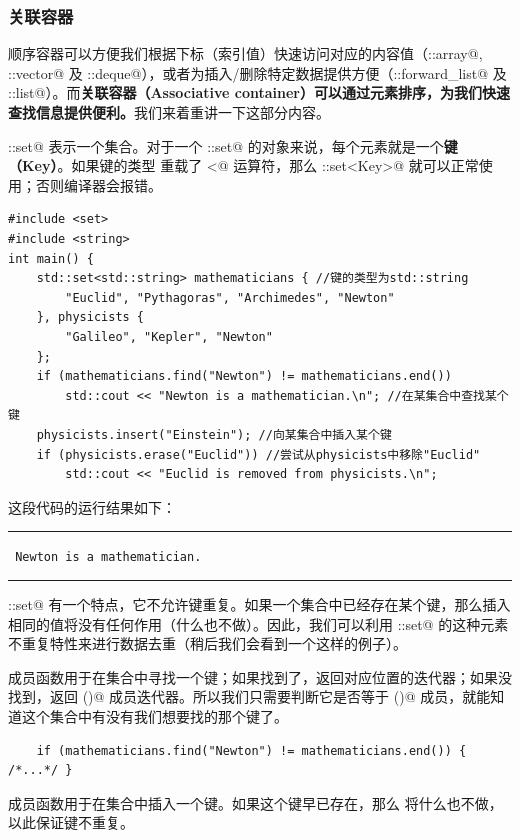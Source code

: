 \subsubsection*{关联容器}
顺序容器可以方便我们根据下标（索引值）快速访问对应的内容值（\lstinline@std::array@, \lstinline@std::vector@ 及 \lstinline@std::deque@），或者为插入/删除特定数据提供方便（\lstinline@std::forward_list@ 及 \lstinline@std::list@）。而\textbf{关联容器（Associative container）可以通过元素排序，为我们快速查找信息提供便利。}我们来着重讲一下这部分内容。\par
\lstinline@std::set@ 表示一个集合。对于一个 \lstinline@std::set@ 的对象来说，每个元素就是一个\textbf{键（Key）}。如果键的类型 \lstinline@Key@ 重载了 \lstinline@<@ 运算符，那么 \lstinline@std::set<Key>@ 就可以正常使用；否则编译器会报错。\par
\begin{lstlisting}
#include <set>
#include <string>
int main() {
    std::set<std::string> mathematicians { //键的类型为std::string
        "Euclid", "Pythagoras", "Archimedes", "Newton"
    }, physicists {
        "Galileo", "Kepler", "Newton"
    };
    if (mathematicians.find("Newton") != mathematicians.end())
        std::cout << "Newton is a mathematician.\n"; //在某集合中查找某个键
    physicists.insert("Einstein"); //向某集合中插入某个键
    if (physicists.erase("Euclid")) //尝试从physicists中移除"Euclid"
        std::cout << "Euclid is removed from physicists.\n"; 
\end{lstlisting}
这段代码的运行结果如下：\\\noindent\rule{\linewidth}{.2pt}\texttt{
Newton is a mathematician.
}\\\noindent\rule{\linewidth}{.2pt}\par
\lstinline@std::set@ 有一个特点，它不允许键重复。如果一个集合中已经存在某个键，那么插入相同的值将没有任何作用（什么也不做）。因此，我们可以利用 \lstinline@std::set@ 的这种元素不重复特性来进行数据去重（稍后我们会看到一个这样的例子）。\par
\lstinline@find@ 成员函数用于在集合中寻找一个键；如果找到了，返回对应位置的迭代器；如果没找到，返回 \lstinline@end()@ 成员迭代器。所以我们只需要判断它是否等于 \lstinline@end()@ 成员，就能知道这个集合中有没有我们想要找的那个键了。
\begin{lstlisting}
    if (mathematicians.find("Newton") != mathematicians.end()) { /*...*/ }
\end{lstlisting}\par
\lstinline@insert@ 成员函数用于在集合中插入一个键。如果这个键早已存在，那么 \lstinline@insert@ 将什么也不做，以此保证键不重复。
